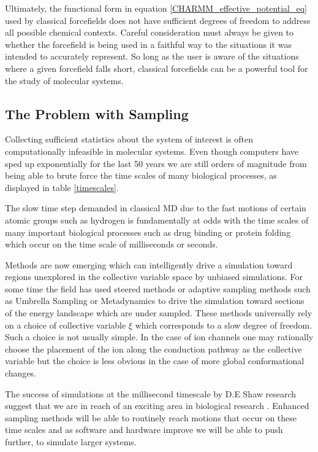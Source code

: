 Ultimately, the functional form in equation \ref{CHARMM_effective_potential_eq} used by classical forcefields does not have sufficient degrees of freedom to address all possible chemical contexts. Careful consideration must always be given to whether the forcefield is being used in a faithful way to the situations it was intended to accurately represent. So long as the user is aware of the situations where a given forcefield falls short, classical forcefields can be a powerful tool for the study of molecular systems.

\subsection{The Problem with Sampling}
\label{sampling_problem}

Collecting sufficient statistics about the system of interest is often computationally infeasible in molecular systems. Even though computers have sped up exponentially for the last 50 years we are still orders of magnitude from being able to brute force the time scales of many biological processes, as displayed in table \ref{timescales}.

The slow time step demanded in classical MD due to the fast motions of certain atomic groups such as hydrogen is fundamentally at odds with the time scales of many important biological processes such as drug binding or protein folding which occur on the time scale of milliseconds or seconds.  

Methods are now emerging which can intelligently drive a simulation toward regions unexplored in the collective variable space by unbiased simulations. For some time the field has used steered methods or adaptive sampling methods such as Umbrella Sampling or Metadynamics to drive the simulation toward sections of the energy landscape which are under sampled. These methods universally rely on a choice of collective variable $\xi$ which corresponds to a slow degree of freedom. Such a choice is not usually simple. In the case of ion channels one may rationally choose the placement of the ion along the conduction pathway as the collective variable but the choice is less obvious in the case of more global conformational changes.

The success of simulations at the millisecond timescale by D.E Shaw research suggest that we are in reach of an exciting area in biological research \cite{lindorff-larsen2016, robustelli2022}. Enhanced sampling methods will be able to routinely reach motions that occur on these time scales and as software and hardware improve we will be able to push further, to simulate larger systems. 

